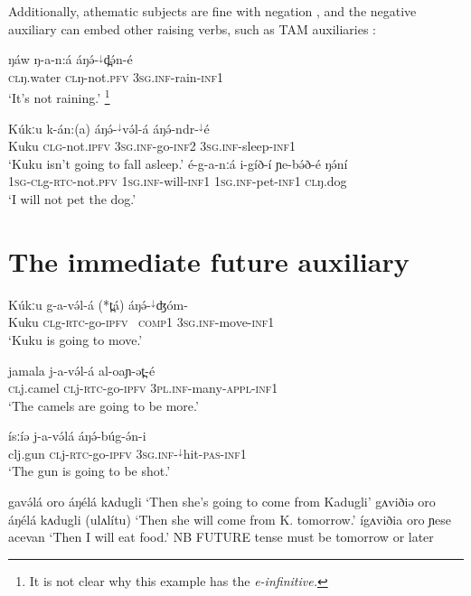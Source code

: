 Additionally, athematic subjects are fine with negation , and the negative auxiliary can embed other raising verbs, such as TAM auxiliaries :

\ea \gll  ŋáw ŋ-a-n:á  áŋə́-$^{↓}$d̪ə́n-é\\
\textsc{cl}ŋ.water \textsc{cl}ŋ-not.\textsc{pfv}   \textsc{3sg.inf}-rain-\textsc{inf1}\\ \label{ex:ch14:neg1}
\glt ‘It's not raining.’ \footnote{It is not clear why this example has the \it{e}-infinitive.}
\z 

\ea  \label{notgo} 
\ea \gll  Kúkːu k-án:(a) áŋə́-$^{↓}$və́l-á áŋə́-ndr-$^{↓}$é\\
Kuku \textsc{clg}-not.\textsc{ipfv} \textsc{3sg.inf}-go-\textsc{inf2} \textsc{3sg.inf}-sleep-\textsc{inf1}\\ \label{ex:ch14:neg2}
\glt `Kuku isn't going to fall asleep.' 
\ex \gll   é-g-a-nːá i-gíð-í ɲe-bə́ð-é ŋə́ní		\\
\textsc{1sg}-\textsc{cl}g-\textsc{rtc}-not.\textsc{pfv} \textsc{1sg.inf}-will-\textsc{inf1} \textsc{1sg.inf}-pet-\textsc{inf1} \textsc{cl}ŋ.dog\\
\glt ‘I will not pet the dog.’	
\z 
\z 


\section{The immediate future auxiliary}

\ea   \gll Kúkːu g-a-və́l-á (*t̪á) áŋə́-$^{↓}$ʤóm- \\
Kuku \textsc{cl}g-\textsc{rtc}-go-\textsc{ipfv} {\ \textsc{comp1}} \textsc{3sg.inf}-move-\textsc{inf1}\\
\glt ‘Kuku is going to move.'
\z 

\ea \gll  jamala j-a-və́l-á al-oaɲ-ət̪-é\\
\textsc{cl}j.camel \textsc{cl}j-\textsc{rtc}-go-\textsc{ipfv} \textsc{3pl.inf}-many-\textsc{appl}-\textsc{inf1}\\
\glt ‘The camels are going to be more.'
\z 

\ea \gll  ísːíə j-a-və́lá áŋə́-búg-ə́n-i	\\
{cl}j.gun \textsc{cl}j-\textsc{rtc}-go-\textsc{ipfv}  \textsc{3sg.inf}-$^{↓}$hit-\textsc{pas}-\textsc{inf1}\\
\glt ‘The gun is going to be shot.’
\z 

gavə́lá oro áŋélá kʌdugli		‘Then she’s going to come from Kadugli’
gʌviðiə oro áŋélá kʌdugli (ulʌlítu)	‘Then she will come from K. tomorrow.’
ígʌviðia oro ɲese acevan		‘Then I will eat food.’	
 NB FUTURE tense must be tomorrow or later

